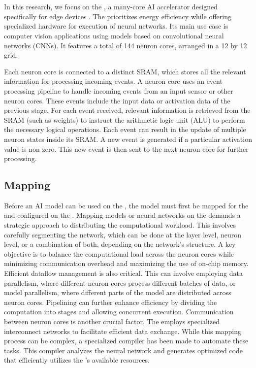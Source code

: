 \section{\graicore{}}
In this research, we focus on the \graicore{}, a many-core AI accelerator designed specifically for edge devices \cite{moreiraNeuronFlowNeuromorphicProcessor2020}.
The \graicore{} prioritizes energy efficiency while offering specialized hardware for execution of neural networks. 
Its main use case is computer vision applications using models based on convolutional neural networks (CNNs).
It features a total of 144 neuron cores, arranged in a 12 by 12 grid.

Each neuron core is connected to a distinct SRAM, which stores all the relevant information for processing incoming events.
A neuron core uses an event processing pipeline to handle incoming events from an input sensor or other neuron cores.
These events include the input data or activation data of the previous stage.
For each event received, relevant information is retrieved from the SRAM (such as weights) to instruct the arithmetic logic unit (ALU) to perform the necessary logical operations.
Each event can result in the update of multiple neuron states inside its SRAM.
A new event is generated if a particular activation value is non-zero.
This new event is then sent to the next neuron core for further processing.

\subsection{Mapping}
Before an AI model can be used on the \graicore{}, the model must first be mapped for the \graicore{} and configured on the \graicore{}.
Mapping models or neural networks on the \graicore{} demands a strategic approach to distributing the computational workload.
This involves carefully segmenting the network, which can be done at the layer level, neuron level, or a combination of both, depending on the network's structure. 
A key objective is to balance the computational load across the neuron cores while minimizing communication overhead and maximizing the use of on-chip memory.
Efficient dataflow management is also critical.
This can involve employing data parallelism, where different neuron cores process different batches of data, or model parallelism, where different parts of the model are distributed across neuron cores.
Pipelining can further enhance efficiency by dividing the computation into stages and allowing concurrent execution.
Communication between neuron cores is another crucial factor.
The \graicore{} employs specialized interconnect networks to facilitate efficient data exchange.
While this mapping process can be complex, a specialized compiler has been made to automate these tasks.
This compiler analyzes the neural network and generates optimized code that efficiently utilizes the \graicore{}'s available resources.


